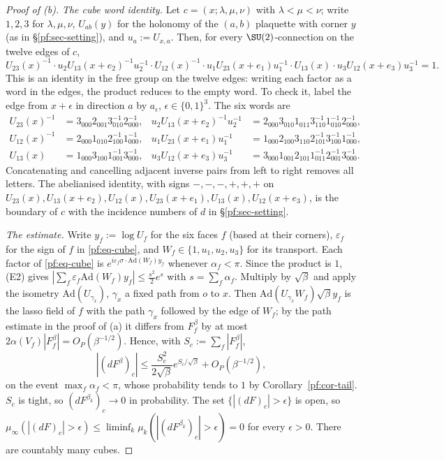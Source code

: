 \begin{proof}[Proof of (b)]
\emph{The cube word identity.} Let $c=(x;\lambda,\mu,\nu)$ with $\lambda<\mu<\nu$; write $1,2,3$ for $\lambda,\mu,\nu$, $U_{ab}(y)$ for the holonomy of the $(a,b)$ plaquette with corner $y$ (as in \S\ref{pf:sec-setting}), and $u_a:=U_{x,a}$. Then, for every $\SU(2)$-connection on the twelve edges of $c$,
\begin{equation}\label{pf:eq-cube}
U_{23}(x)^{-1}\cdot u_2U_{13}(x+e_2)^{-1}u_2^{-1}\cdot U_{12}(x)^{-1}\cdot u_1U_{23}(x+e_1)u_1^{-1}\cdot U_{13}(x)\cdot u_3U_{12}(x+e_3)u_3^{-1}=1 .
\end{equation}
This is an identity in the free group on the twelve edges: writing each factor as a word in the edges, the product reduces to the empty word. To check it, label the edge from $x+\epsilon$ in direction $a$ by $a_\epsilon$, $\epsilon\in\{0,1\}^3$. The six words are
\begin{align*}
U_{23}(x)^{-1}&=3_{000}2_{001}3_{010}^{-1}2_{000}^{-1}, &
u_2U_{13}(x+e_2)^{-1}u_2^{-1}&=2_{000}3_{010}1_{011}3_{110}^{-1}1_{010}^{-1}2_{000}^{-1},\\
U_{12}(x)^{-1}&=2_{000}1_{010}2_{100}^{-1}1_{000}^{-1}, &
u_1U_{23}(x+e_1)u_1^{-1}&=1_{000}2_{100}3_{110}2_{101}^{-1}3_{100}^{-1}1_{000}^{-1},\\
U_{13}(x)&=1_{000}3_{100}1_{001}^{-1}3_{000}^{-1}, &
u_3U_{12}(x+e_3)u_3^{-1}&=3_{000}1_{001}2_{101}1_{011}^{-1}2_{001}^{-1}3_{000}^{-1}.
\end{align*}
Concatenating and cancelling adjacent inverse pairs from left to right removes all letters. The abelianised identity, with signs $-,-,-,+,+,+$ on $U_{23}(x),U_{13}(x+e_2),U_{12}(x),U_{23}(x+e_1),U_{13}(x),U_{12}(x+e_3)$, is the boundary of $c$ with the incidence numbers of $d$ in \S\ref{pf:sec-setting}.

\emph{The estimate.} Write $y_f:=\log U_f$ for the six faces $f$ (based at their corners), $\varepsilon_f$ for the sign of $f$ in \eqref{pf:eq-cube}, and $W_f\in\{1,u_1,u_2,u_3\}$ for its transport. Each factor of \eqref{pf:eq-cube} is $e^{i\varepsilon_f\sigma\cdot\mathrm{Ad}(W_f)y_f}$ whenever $\alpha_f<\pi$. Since the product is $1$, (E2) gives $|\sum_f\varepsilon_f\mathrm{Ad}(W_f)y_f|\le\frac{s^2}2e^s$ with $s=\sum_f\alpha_f$. Multiply by $\sqrt\beta$ and apply the isometry $\mathrm{Ad}(U_{\gamma_x})$, $\gamma_x$ a fixed path from $o$ to $x$. Then $\mathrm{Ad}(U_{\gamma_x}W_f)\sqrt\beta y_f$ is the lasso field of $f$ with the path $\gamma_x$ followed by the edge of $W_f$; by the path estimate in the proof of (a) it differs from $F^\beta_f$ by at most $2\alpha(V_f)|F^\beta_f|=O_P(\beta^{-1/2})$. Hence, with $S_c:=\sum_f|F^\beta_f|$,
\[
|(dF^\beta)_c|\le\frac{S_c^2}{2\sqrt\beta}e^{S_c/\sqrt\beta}+O_P(\beta^{-1/2}),
\]
on the event $\max_f\alpha_f<\pi$, whose probability tends to $1$ by Corollary~\ref{pf:cor-tail}. $S_c$ is tight, so $(dF^{\beta_k})_c\to0$ in probability. The set $\{|(dF)_c|>\epsilon\}$ is open, so $\mu_\infty(|(dF)_c|>\epsilon)\le\liminf_k\mu_k(|(dF^{\beta_k})_c|>\epsilon)=0$ for every $\epsilon>0$. There are countably many cubes.
\end{proof}

